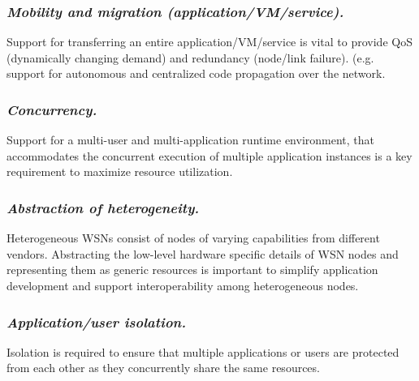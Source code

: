 	\subsubsection{ \textbf{\emph{Mobility and migration (application/VM/service).}}} Support for transferring an entire application/VM/service is vital to provide QoS (dynamically changing demand) and redundancy (node/link failure). (e.g. support for autonomous and centralized code propagation over the network.

	\subsubsection{ \textbf{\emph{Concurrency.}}} Support for a multi-user and multi-application runtime environment, that accommodates the concurrent execution of multiple application instances is a key requirement to maximize resource utilization.
	
	\subsubsection{ \textbf{\emph{Abstraction of heterogeneity.}}} Heterogeneous WSNs consist of nodes of varying capabilities from different vendors. Abstracting the low-level hardware specific details of WSN nodes and representing them as generic resources is important to simplify application development and support interoperability among heterogeneous nodes. 
	
	
	
	\subsubsection{\textbf{\emph{Application/user isolation.}}} 
	
	Isolation is required to ensure that multiple applications or users are protected from each other as they concurrently share the same resources.  
	
	
	
